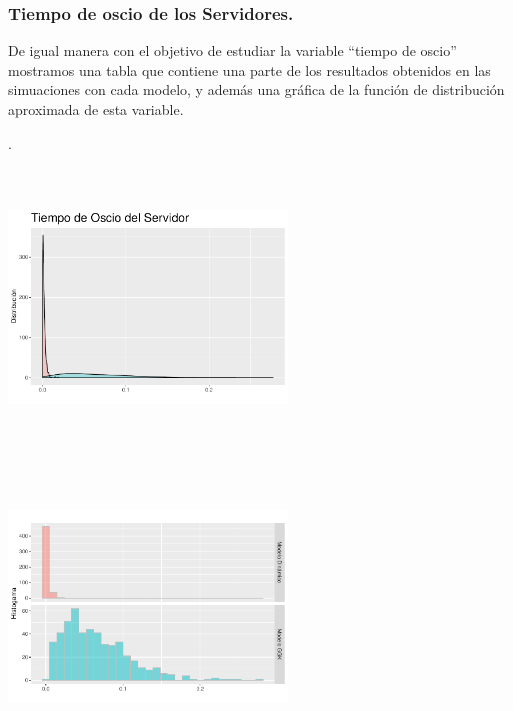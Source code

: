 \documentclass[]{article}
\begin{document}
\newpage

\subsubsection{Tiempo de oscio de los
Servidores.}\label{tiempo-de-oscio-de-los-servidores.}

De igual manera con el objetivo de estudiar la variable ``tiempo de
oscio'' mostramos una tabla que contiene una parte de los resultados
obtenidos en las simuaciones con cada modelo, y además una gráfica de la
función de distribución aproximada de esta variable.

.

\begin{center}\includegraphics[width=280px,height=280px]{sistema_dinamico_files/figure-latex/unnamed-chunk-19-1} \end{center}

\begin{center}\includegraphics[width=280px,height=280px]{sistema_dinamico_files/figure-latex/unnamed-chunk-20-1} \end{center}
\end{document}

